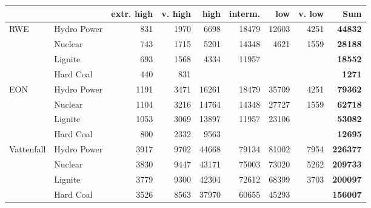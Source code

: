 \begin{table}
\centering

\begin{tabular}{llrrrrrrr}
\hline
           &            & extr. high &    v. high &       high &    interm. &        low &     v. low &  {\bf Sum} \\
\hline
       RWE & Hydro Power &        831 &       1970 &       6698 &      18479 &      12603 &       4251 & {\bf 44832} \\

           &    Nuclear &        743 &       1715 &       5201 &      14348 &       4621 &       1559 & {\bf 28188} \\

           &    Lignite &        693 &       1568 &       4334 &      11957 &            &            & {\bf 18552} \\

           &  Hard Coal &        440 &        831 &            &            &            &            & {\bf 1271} \\
\hline
       EON & Hydro Power &       1191 &       3471 &      16261 &      18479 &      35709 &       4251 & {\bf 79362} \\

           &    Nuclear &       1104 &       3216 &      14764 &      14348 &      27727 &       1559 & {\bf 62718} \\

           &    Lignite &       1053 &       3069 &      13897 &      11957 &      23106 &            & {\bf 53082} \\

           &  Hard Coal &        800 &       2332 &       9563 &            &            &            & {\bf 12695} \\
\hline
Vattenfall & Hydro Power &       3917 &       9702 &      44668 &      79134 &      81002 &       7954 & {\bf 226377} \\

           &    Nuclear &       3830 &       9447 &      43171 &      75003 &      73020 &       5262 & {\bf 209733} \\

           &    Lignite &       3779 &       9300 &      42304 &      72612 &      68399 &       3703 & {\bf 200097} \\

           &  Hard Coal &       3526 &       8563 &      37970 &      60655 &      45293 &            & {\bf 156007} \\


\end{tabular}
\end{table}
